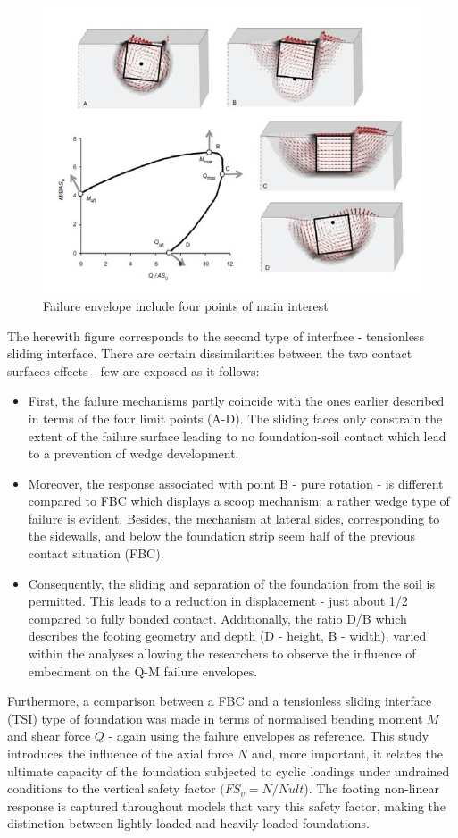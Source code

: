\documentclass[10pt,a4paper]{report}
\begin{document}
\begin{figure}[h!]
	\centering
		\includegraphics[width=0.8\linewidth]{"MQN"}
		\caption{Failure envelope include four points of main interest}
		\label{MQN}
\end{figure}

The herewith figure corresponds to the second type of interface - tensionless sliding interface. There are certain dissimilarities between the two contact surfaces effects - few are exposed as it follows:
\begin{itemize}
	\item First, the failure mechanisms partly coincide with the ones earlier described in terms of the four limit points (A-D). The sliding faces only constrain the extent of the failure surface leading to no foundation-soil contact which lead to a prevention of wedge development.
	\item Moreover, the response associated with point B - pure rotation - is different compared to FBC which displays a scoop mechanism; a rather wedge type of failure is evident. Besides, the mechanism at lateral sides, corresponding to the sidewalls, and below the foundation strip seem half of the previous contact situation (FBC).
	\item Consequently, the sliding and separation of the foundation from the soil is permitted. This leads to a reduction in displacement - just about 1/2 compared to fully bonded contact. Additionally, the ratio D/B which describes the footing geometry and depth (D - height, B - width), varied within the analyses allowing the researchers to observe the influence of embedment on the Q-M failure envelopes. 
\end{itemize}

Furthermore, a comparison between a FBC and a tensionless sliding interface (TSI) type of foundation was made in terms of normalised bending moment $M$ and shear force $Q$ - again using the failure envelopes as reference. This study introduces the influence of the axial force $N$ and, more important, it relates the ultimate capacity of the foundation subjected to cyclic loadings under undrained conditions to the vertical safety factor $(FS_v = N/Nult$). The footing non-linear response is captured throughout models that vary this safety factor, making the distinction between lightly-loaded and heavily-loaded foundations. 
\end{document}
